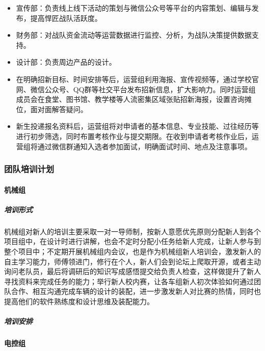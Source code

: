                 \begin{itemize}
                    \item 宣传部：负责线上线下活动的策划与微信公众号等平台的内容策划、编辑与发布，提高悍匠战队活跃度。
                    \item 财务部：对战队资金流动等运营数据进行监控、分析，为战队决策提供数据支持。
                    \item 设计部：负责周边产品的设计。
                    \item 在明确招新目标、时间安排等后，运营组利用海报、宣传视频等，通过学校官网、微信公众号、QQ群等社交平台发布招新信息，扩大影响力。同时运营组成员会在食堂、图书馆、教学楼等人流密集区域张贴招新海报，设置咨询摊位，面对面解答疑问。
                    \item 新生投递报名资料后，运营组将对申请者的基本信息、专业技能、过往经历等进行初步筛选，同时布置考核作业与提交期限。在收到申请者考核作业后，运营组将通过微信群通知入选者参加面试，明确面试时间、地点及注意事项。
                \end{itemize}

    \subsubsection{团队培训计划}

        \paragraph{机械组}

            \subparagraph{培训形式}

                机械组对新人的培训主要采取一对一导师制，按新人意愿优先原则分配新人到各个项目组中，在设计时进行讲解，也会不定时分配小任务给新人完成，让新人参与到整个项目中；不定期开展机械组内会议，也是作为机械组新人培训会，激发新人的自主学习能力，师傅领进门，修行在个人，新人们会到论坛上爬取开源，或者主动询问老队员，最后将调研后的知识写成感悟提交给负责人检查，这样做提升了新人寻找资料来完成任务的能力；举行新人校内赛，让各车组新人初次体验如何通过团队合作、相互沟通完成车辆的设计的装配，进一步激发新人对比赛的热情，同时也提高他们的软件熟练度和设计思维及装配能力。
  
            \subparagraph{培训安排}


        \paragraph{电控组}


